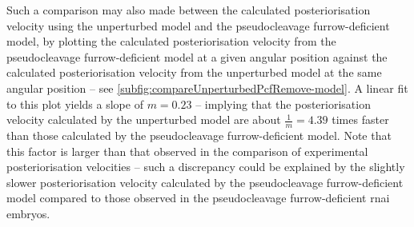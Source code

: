 Such a comparison may also made between the calculated posteriorisation velocity using the unperturbed model and the pseudocleavage furrow-deficient model, by plotting the calculated posteriorisation velocity from the pseudocleavage furrow-deficient model at a given angular position against the calculated posteriorisation velocity from the unperturbed model at the same angular position -- see \autoref{subfig:compareUnperturbedPcfRemove-model}. A linear fit to this plot yields a slope of $m = \num{0.23}$ -- implying that the posteriorisation velocity calculated by the unperturbed model are about $\frac{1}{m} = \num{4.39}$ times faster than those calculated by the pseudocleavage furrow-deficient model. Note that this factor is larger than that observed in the comparison of experimental posteriorisation velocities -- such a discrepancy could be explained by the slightly slower posteriorisation velocity calculated by the pseudocleavage furrow-deficient model compared to those observed in the pseudocleavage furrow-deficient  \ac{rnai} embryos.

